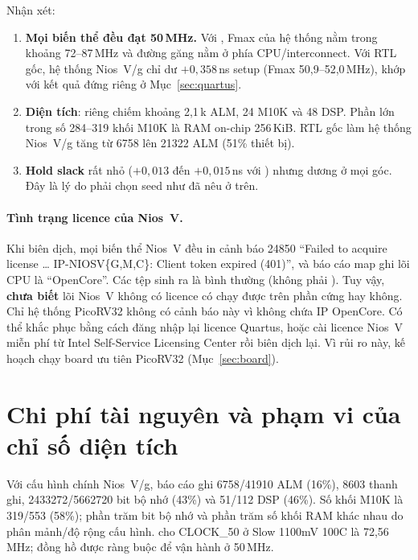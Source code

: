 Nhận xét:
\begin{enumerate}
  \item \textbf{Mọi biến thể đều đạt 50\,MHz.} Với \NPU{} , Fmax của hệ thống nằm trong khoảng 72--87\,MHz và đường găng nằm ở phía CPU/interconnect. Với RTL gốc, hệ thống Nios~V/g chỉ dư $+0{,}358$\,ns setup (Fmax 50,9--52,0\,MHz), khớp với kết quả \NPU{} đứng riêng ở Mục~\ref{sec:quartus}.
  \item \textbf{Diện tích}: riêng \NPU{}  chiếm khoảng 2,1\,k ALM, 24 M10K và 48 DSP. Phần lớn trong số 284--319 khối M10K là RAM on-chip 256\,KiB. RTL gốc làm hệ thống Nios~V/g tăng từ \num{6758} lên \num{21322} ALM (51\% thiết bị).
  \item \textbf{Hold slack} rất nhỏ ($+0{,}013$ đến $+0{,}015$\,ns với ) nhưng dương ở mọi góc. Đây là lý do phải chọn seed như đã nêu ở trên.
\end{enumerate}

\paragraph{Tình trạng licence của Nios~V.} Khi biên dịch, mọi biến thể Nios~V đều in cảnh báo 24850 ``Failed to acquire license \ldots{} IP-NIOSV\{G,M,C\}: Client token expired (401)'', và báo cáo map ghi lõi CPU là ``OpenCore''. Các tệp  sinh ra là bình thường (không phải ). Tuy vậy, \textbf{chưa biết} lõi Nios~V không có licence có chạy được trên phần cứng hay không. Chỉ hệ thống PicoRV32 không có cảnh báo này vì không chứa IP OpenCore. Có thể khắc phục bằng cách đăng nhập lại licence Quartus, hoặc cài licence Nios~V miễn phí từ Intel Self-Service Licensing Center rồi biên dịch lại. Vì rủi ro này, kế hoạch chạy board ưu tiên PicoRV32 (Mục~\ref{sec:board}).

\section{Chi phí tài nguyên và phạm vi của chỉ số diện tích}
\label{sec:area-cost}
Với cấu hình chính Nios~V/g, báo cáo  ghi \num{6758}/\num{41910} ALM (16\%), \num{8603} thanh ghi, \num{2433272}/\num{5662720} bit bộ nhớ (43\%) và 51/112 DSP (46\%). Số khối M10K là 319/553 (58\%); phần trăm bit bộ nhớ và phần trăm số khối RAM khác nhau do phân mảnh/độ rộng cấu hình.  cho CLOCK\_50 ở Slow 1100mV 100C là 72,56\,MHz; đồng hồ được ràng buộc để vận hành ở 50\,MHz.


